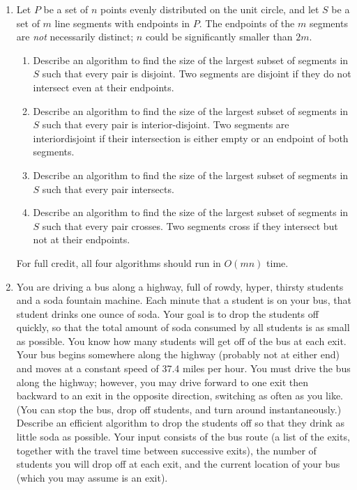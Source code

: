 \begin{enumerate}[label=\arabic*.,ref=\thechapter.\arabic*,leftmargin=*,align=left,widest*=99,itemsep=1.5ex plus 0.5ex]
\begin{enumerate}[resume]
\item Describe and analyze an algorithm to compute the largest subset of $L$ in which \textbf{\textit{every}} pair of segments intersects.
\end{enumerate}
\item Let $P$ be a set of $n$ points evenly distributed on the unit circle, and let $S$ be a set of $m$ line segments with endpoints in $P$.
The endpoints of the $m$ segments are \textit{not} necessarily distinct; $n$ could be significantly smaller than $2m$.
\begin{enumerate}
\item Describe an algorithm to find the size of the largest subset of segments in $S$ such that every pair is disjoint.
Two segments are disjoint if they do not intersect even at their endpoints.
\item Describe an algorithm to find the size of the largest subset of segments in $S$ such that every pair is interior-disjoint.
Two segments are interiordisjoint if their intersection is either empty or an endpoint of both segments.
\item Describe an algorithm to find the size of the largest subset of segments in $S$ such that every pair intersects.
\item Describe an algorithm to find the size of the largest subset of segments in $S$ such that every pair crosses.
Two segments cross if they intersect but not at their endpoints.
\end{enumerate}
For full credit, all four algorithms should run in $O(mn)$ time.
\item You are driving a bus along a highway, full of rowdy, hyper, thirsty students and a soda fountain machine.
Each minute that a student is on your bus, that student drinks one ounce of soda.
Your goal is to drop the students off quickly, so that the total amount of soda consumed by all students is as small as possible.
You know how many students will get off of the bus at each exit.
Your bus begins somewhere along the highway (probably not at either end) and moves at a constant speed of 37.4 miles per hour.
You must drive the bus along the highway; however, you may drive forward to one exit then backward to an exit in the opposite direction, switching as often as you like.
(You can stop the bus, drop off students, and turn around instantaneously.)
Describe an efficient algorithm to drop the students off so that they drink as little soda as possible.
Your input consists of the bus route (a list of the exits, together with the travel time between successive exits), the number of students you will drop off at each exit, and the current location of your bus (which you may assume is an exit).

\end{enumerate}
